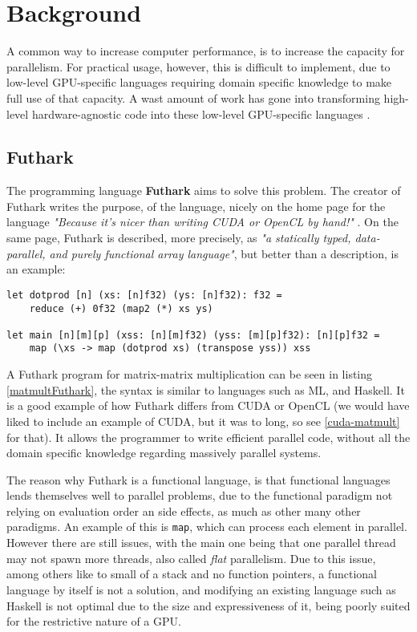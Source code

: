 \section{Background}
A common way to increase computer performance, is to increase the capacity for parallelism. For practical usage, however, this is difficult to implement, due to low-level GPU-specific languages requiring domain specific knowledge to make full use of that capacity. A wast amount of work has gone into transforming high-level hardware-agnostic code into these low-level GPU-specific languages \cite{inc-flat}. 

\subsection{Futhark}
The programming language \textbf{Futhark} aims to solve this problem. The creator of Futhark writes the purpose, of the language, nicely on the home page for the language \textit{"Because it’s nicer than writing CUDA or OpenCL by hand!"} \cite{futhark-home}. On the same page, Futhark is described, more precisely, as \textit{"a statically typed, data-parallel, and purely functional array language"}, but better than a description, is an example:
\begin{center}
\lstset{language=haskell}
\begin{lstlisting}
let dotprod [n] (xs: [n]f32) (ys: [n]f32): f32 =
	reduce (+) 0f32 (map2 (*) xs ys)

let main [n][m][p] (xss: [n][m]f32) (yss: [m][p]f32): [n][p]f32 =
	map (\xs -> map (dotprod xs) (transpose yss)) xss
\end{lstlisting}%
\label{matmultFuthark}
\end{center}
A Futhark program for matrix-matrix multiplication can be seen in listing \ref{matmultFuthark}, the syntax is similar to languages such as ML, and Haskell. It is a good example of how Futhark differs from CUDA or OpenCL (we would have liked to include an example of CUDA, but it was to long, so see \ref{cuda-matmult} for that). It allows the programmer to write efficient parallel code, without all the domain specific knowledge regarding massively parallel systems. 

The reason why Futhark is a functional language, is that functional languages lends themselves well to parallel problems, due to the functional paradigm not relying on evaluation order an side effects, as much as other many other paradigms. An example of this is \texttt{map}, which can process each element in parallel. However there are still issues, with the main one being that one parallel thread may not spawn more threads, also called \textit{flat} parallelism. Due to this issue, among others like to small of a stack and no function pointers, a functional language by itself is not a solution, and modifying an existing language such as Haskell is not optimal due to the size and expressiveness of it, being poorly suited for the restrictive nature of a GPU. 

